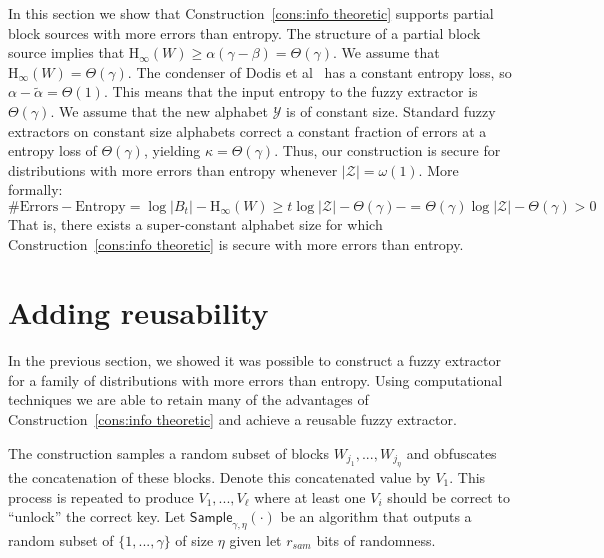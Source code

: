 \documentclass[11pt]{article}
\newcommand{\consref}[1]{\mbox{Construction~\ref{#1}}}
\newcommand{\class}[1]{{\ensuremath{\mathsf{#1}}}}
\newcommand{\sample}{\ensuremath{\class{Sample}}\xspace}
\newcommand{\Hoo}{\mathrm{H}_\infty}
\begin{document}
In this section we show that \consref{cons:info theoretic} supports partial block sources with more errors than entropy.  The structure of a partial block source implies that  $\Hoo(W) \ge \alpha (\gamma-\beta ) = \Theta(\gamma)$.  We assume that $\Hoo(W) = \Theta(\gamma)$. The condenser of Dodis et al~\cite{dodis2014key} has a constant entropy loss, so $\alpha-\tilde{\alpha} = \Theta(1)$. This means that the input entropy to the fuzzy extractor is $\Theta(\gamma)$.   We assume that the new alphabet $\mathcal{Y}$ is of constant size.  Standard fuzzy extractors on constant size alphabets correct a constant fraction of errors at a entropy loss of $\Theta(\gamma)$, yielding $\kappa = \Theta(\gamma)$.  Thus, our construction is secure for distributions with more errors than entropy whenever $|\mathcal{Z}| = \omega(1)$.
More formally:
\[
\text{\# Errors} - \text{Entropy} = \log |B_t| - \Hoo(W) \ge  t \log |\mathcal{Z}| - \Theta(\gamma)-= \Theta(\gamma) \log |\mathcal{Z}| - \Theta(\gamma)  > 0
\]
That is, there exists a super-constant alphabet size for which \consref{cons:info theoretic} is secure with more errors than entropy.

\section{Adding reusability}
\label{sec:sampling}
In the previous section, we showed it was possible to construct a fuzzy extractor for a family of distributions with more errors than entropy.  Using computational techniques we are able to retain many of the advantages of \consref{cons:info theoretic} and achieve a reusable fuzzy extractor.

The construction samples a random subset of blocks $W_{j_1},..., W_{j_\eta}$ and obfuscates the concatenation of these blocks.  Denote this concatenated value by $V_1$.  This process is repeated to produce $V_1,..., V_\ell$ where at least one $V_i$ should be correct to ``unlock'' the correct key.
Let $\sample_{\gamma, \eta}(\cdot)$ be an algorithm that  outputs a random subset of $\{1,..., \gamma\}$ of size $\eta$ given let $r_{sam}$ bits of randomness.
\end{document}

